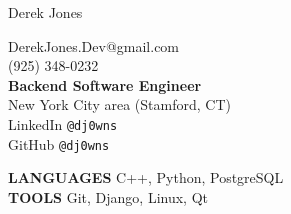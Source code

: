 \documentclass[10pt,oneside]{article}
\makeatletter
\newcommand{\name}{Derek Jones}
\newcommand{\cellphone}{(925) 348-0232}
\newcommand{\email}{DerekJones.Dev@gmail.com}
\newcommand{\github}{GitHub \texttt{@dj0wns}}
\newcommand{\linkedin}{LinkedIn \texttt{@dj0wns}}
\newcommand{\languages}{C++, Python, PostgreSQL}
\newcommand{\tools}{Git, Django, Linux, Qt}
\newcommand{\bigname}[1]{
  \begin{center}\huge#1\end{center}
}
\makeatother
\begin{document}
 \selectfont

\bigname{\name}
\vspace{-5pt}
\begin{flushleft}
 \begin{multicols}{3}
  \email \\
  \cellphone \\
  \centering \textbf{Backend Software Engineer} \\
  \centering New York City area (Stamford, CT) \\
  \hfill\linkedin \\
  \hfill\github \\
 \end{multicols}
\end{flushleft}

\begin{center}
 \begin{multicols}{2}
  \textbf{\uppercase{Languages}} \languages \\
  \textbf{\uppercase{Tools}} \tools \\
 \end{multicols}
\end{center}

\vspace{-5 pt}
\end{document}
